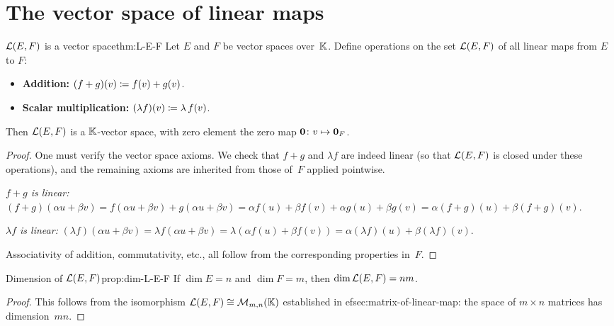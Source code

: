 \section{The vector space of linear maps}\label{sec:space-of-linear-maps}

\begin{theorem}{${\mathcal{L}}(E,F)$ is a vector space}{thm:L-E-F}
Let $E$ and $F$ be vector spaces over~${\mathbb{K}}$. Define operations on the
set ${\mathcal{L}}(E,F)$ of all linear maps from $E$ to $F$:
\begin{itemize}
  \item \textbf{Addition:} $(f+g)(v) \coloneqq f(v)+g(v)$.
  \item \textbf{Scalar multiplication:} $(\lambda f)(v) \coloneqq \lambda\,f(v)$.
\end{itemize}
Then ${\mathcal{L}}(E,F)$ is a ${\mathbb{K}}$-vector space, with zero element the zero map
$\mathbf{0}\colon v\mapsto \mathbf{0}_F$.
\end{theorem}

\begin{proof}
One must verify the vector space axioms. We check that $f+g$ and
$\lambda f$ are indeed linear (so that ${\mathcal{L}}(E,F)$ is closed under
these operations), and the remaining axioms are inherited from those
of~$F$ applied pointwise.

\emph{$f+g$ is linear:}
$(f+g)(\alpha u + \beta v)
= f(\alpha u+\beta v) + g(\alpha u+\beta v)
= \alpha f(u)+\beta f(v)+\alpha g(u)+\beta g(v)
= \alpha(f+g)(u)+\beta(f+g)(v)$.

\emph{$\lambda f$ is linear:}
$(\lambda f)(\alpha u+\beta v)
= \lambda f(\alpha u+\beta v)
= \lambda(\alpha f(u)+\beta f(v))
= \alpha(\lambda f)(u)+\beta(\lambda f)(v)$.

Associativity of addition, commutativity, etc., all follow from the
corresponding properties in~$F$.
\end{proof}

\begin{proposition}{Dimension of ${\mathcal{L}}(E,F)$}{prop:dim-L-E-F}
If $\dim E = n$ and $\dim F = m$, then $\dim{\mathcal{L}}(E,F) = nm$.
\end{proposition}

\begin{proof}
This follows from the isomorphism ${\mathcal{L}}(E,F)\cong\mathcal{M}_{m,n}({\mathbb{K}})$
established in 
ef{sec:matrix-of-linear-map}: the space of
$m\times n$ matrices has dimension~$mn$.
\end{proof}

